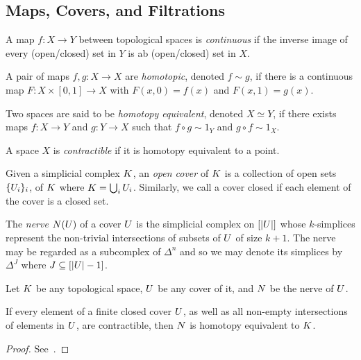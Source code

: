 \subsection{Maps, Covers, and Filtrations}
\begin{definition}
A map $f: X \rightarrow Y$ between topological spaces is \emph{continuous} if the inverse image of every (open/closed) set in $Y$ is ab (open/closed) set in $X$. 
\end{definition}
\begin{definition}
A pair of maps $f,g: X \rightarrow X$ are \emph{homotopic}, denoted $f \sim g$, if there is a continuous map $F: X \times [0,1] \rightarrow X$ with $F(x,0) = f(x)$ and $F(x,1) = g(x)$. 
\end{definition}
\begin{definition}
Two spaces are said to be \emph{homotopy equivalent}, denoted $X \simeq Y$, if there exists maps $f: X \rightarrow Y$ and $g: Y \rightarrow X$ such that $f \circ g \sim 1_Y$ and $g \circ f \sim 1_X$.
\end{definition}
\begin{definition}[Contractible]
A space $X$ is \emph{contractible} if it is homotopy equivalent to a point.
\end{definition}
\begin{definition}[Cover]
Given a simplicial complex $K$, an \emph{open cover} of $K$ is a collection of open sets $\{U_i\}_i$, of $K$ where $K = \bigcup_i U_i$. Similarly, we call a cover closed if each element of the cover is a closed set.
\end{definition}
\begin{definition}[Nerve]
The \emph{nerve} $N(U)$ of a cover $U$ is the simplicial complex on $[|U|]$ whose $k$-simplices represent the non-trivial intersections of subsets of $U$ of size $k+1$. The nerve may be regarded as a subcomplex of $\Delta^n$ and so we may denote its simplices by $\Delta^J$ where $J \subseteq [|U|-1]$.
\end{definition}
Let $K$ be any topological space, $U$ be any cover of it, and $N$ be the nerve of $U$. 
\begin{lemma}
If every element of a finite closed cover $U$, as well as all non-empty intersections of elements in $U$, are contractible, then $N$ is homotopy equivalent to $K$.
\end{lemma}
\begin{proof}
See~\cite{hatcher}.
\end{proof}
